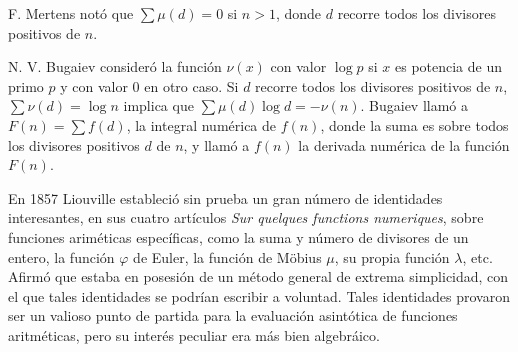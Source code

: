 F. Mertens notó que $\sum \mu(d) = 0$ si $n>1$, donde $d$ recorre todos los divisores positivos de $n$.
\bigskip

N. V. Bugaiev consideró la función $\nu(x)$ con valor $\log p$ si $x$ es potencia de un primo $p$ y con valor 0 en otro caso. Si $d$ recorre todos los divisores positivos de $n$, $\sum \nu(d) = \log n$ implica que $\sum \mu(d) \log d = -\nu(n)$. Bugaiev llamó a $F(n) = \sum f(d)$, la integral numérica de $f(n)$, donde la suma es sobre todos los divisores positivos $d$ de $n$, y llamó a $f(n)$ la derivada numérica de la función $F(n)$.
\bigskip

En 1857 Liouville estableció sin prueba un gran número de identidades interesantes, en sus cuatro artículos \emph{Sur quelques functions numeriques}, sobre funciones ariméticas específicas, como la suma y número de divisores de un entero, la función $\varphi$ de Euler, la función de Möbius $\mu$, su propia función $\lambda$, etc. Afirmó que estaba en posesión de un método general de extrema simplicidad, con el que tales identidades se podrían escribir a voluntad. Tales identidades provaron ser un valioso punto de partida para la evaluación asintótica de funciones aritméticas, pero su interés peculiar era más bien algebráico.
